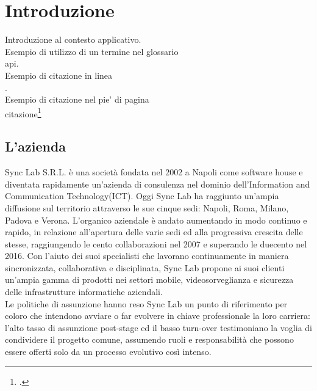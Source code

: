 
\chapter{Introduzione}
\label{cap:introduzione}

Introduzione al contesto applicativo.\\

\noindent Esempio di utilizzo di un termine nel glossario \\
\gls{api}. \\

\noindent Esempio di citazione in linea \\
\cite{site:agile-manifesto}. \\

\noindent Esempio di citazione nel pie' di pagina \\
citazione\footcite{womak:lean-thinking} \\

\section{L'azienda}

Sync Lab S.R.L. è una società fondata nel 2002 a Napoli come software house e diventata rapidamente un'azienda di consulenza nel dominio dell'Information and Communication Technology(ICT).
Oggi Sync Lab ha raggiunto un’ampia diffusione sul territorio attraverso le sue cinque sedi: Napoli, Roma, Milano, Padova e Verona.
L’organico aziendale è andato aumentando in modo continuo e rapido, in relazione all’apertura delle varie sedi ed alla progressiva crescita delle stesse, raggiungendo le cento collaborazioni nel 2007 e superando le duecento nel 2016. Con l’aiuto dei suoi specialisti che lavorano continuamente in maniera sincronizzata, collaborativa e disciplinata, Sync Lab propone ai suoi clienti un'ampia gamma di prodotti nei settori mobile, videosorveglianza e sicurezza delle infrastrutture informatiche aziendali.\\
Le politiche di assunzione hanno reso Sync Lab un punto di riferimento per coloro che intendono avviare o far evolvere in chiave professionale la loro carriera: l’alto tasso di assunzione post-stage ed il basso turn-over testimoniano la voglia di condividere il progetto comune, assumendo ruoli e responsabilità che possono essere offerti solo da un processo evolutivo così intenso.

